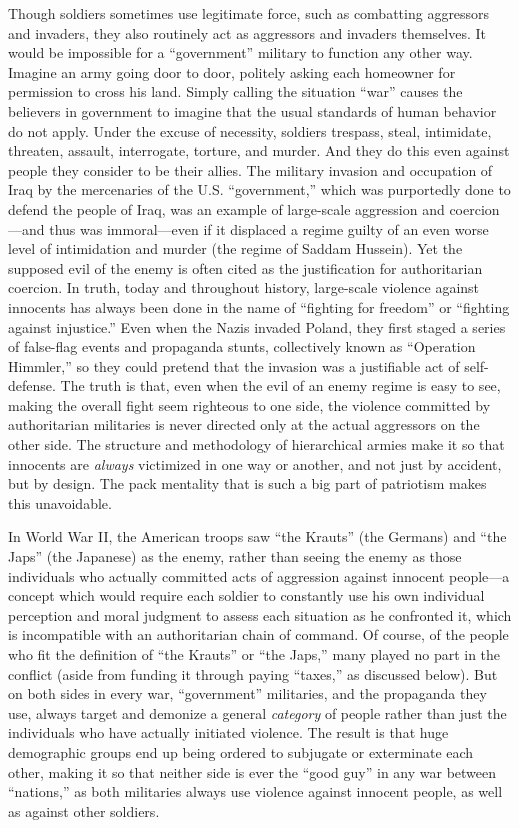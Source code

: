 \documentclass{book}
\begin{document}
Though soldiers sometimes use legitimate force, such as combatting aggressors and invaders, they also routinely act as aggressors and invaders themselves. It would be impossible for a \enquote{government} military to function any other way. Imagine an army going door to door, politely asking each homeowner for permission to cross his land. Simply calling the situation \enquote{war} causes the believers in government to imagine that the usual standards of human behavior do not apply. Under the excuse of necessity, soldiers trespass, steal, intimidate, threaten, assault, interrogate, torture, and murder. And they do this even against people they consider to be their allies. The military invasion and occupation of Iraq by the mercenaries of the U.S. \enquote{government,} which was purportedly done to defend the people of Iraq, was an example of large-scale aggression and coercion---and thus was immoral---even if it displaced a regime guilty of an even worse level of intimidation and murder (the regime of Saddam Hussein). Yet the supposed evil of the enemy is often cited as the justification for authoritarian coercion. In truth, today and throughout history, large-scale violence against innocents has always been done in the name of \enquote{fighting for freedom} or \enquote{fighting against injustice.} Even when the Nazis invaded Poland, they first staged a series of false-flag events and propaganda stunts, collectively known as \enquote{Operation Himmler,} so they could pretend that the invasion was a justifiable act of self-defense. The truth is that, even when the evil of an enemy regime is easy to see, making the overall fight seem righteous to one side, the violence committed by authoritarian militaries is never directed only at the actual aggressors on the other side. The structure and methodology of hierarchical armies make it so that innocents are \emph{always} victimized in one way or another, and not just by accident, but by design. The pack mentality that is such a big part of patriotism makes this unavoidable.

In World War II, the American troops saw \enquote{the Krauts} (the Germans) and \enquote{the Japs} (the Japanese) as the enemy, rather than seeing the enemy as those individuals who actually committed acts of aggression against innocent people---a concept which would require each soldier to constantly use his own individual perception and moral judgment to assess each situation as he confronted it, which is incompatible with an authoritarian chain of command. Of course, of the people who fit the definition of \enquote{the Krauts} or \enquote{the Japs,} many played no part in the conflict (aside from funding it through paying \enquote{taxes,} as discussed below). But on both sides in every war, \enquote{government} militaries, and the propaganda they use, always target and demonize a general \emph{category} of people rather than just the individuals who have actually initiated violence. The result is that huge demographic groups end up being ordered to subjugate or exterminate each other, making it so that neither side is ever the \enquote{good guy} in any war between \enquote{nations,} as both militaries always use violence against innocent people, as well as against other soldiers.
\end{document}

